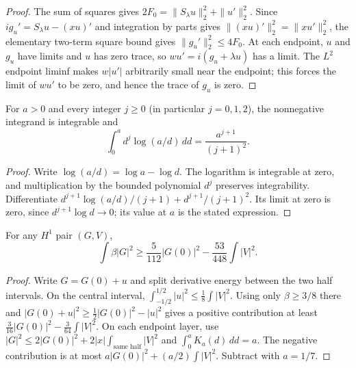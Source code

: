 \begin{proof}
\leanok
The sum of squares gives $2F_0=\|S_\lambda u\|_2^2+\|u'\|_2^2$.
Since $ig_u'=S_\lambda u-(xu)'$ and integration by parts gives
$\|(xu)'\|_2^2=\|xu'\|_2^2$, the elementary two-term square bound gives
$\|g_u'\|_2^2\le4F_0$.
At each endpoint, $u$ and $g_u$ have limits and $u$ has zero trace,
so $wu'=i(g_u+\lambda u)$ has a limit.
The $L^2$ endpoint liminf makes $w|u'|$ arbitrarily small near the endpoint;
this forces the limit of $wu'$ to be zero, and hence the trace of $g_u$ is zero.
\end{proof}

\begin{lemma}
\label{lem:corrected-log-moments}
\leanok
For $a>0$ and every integer $j\ge0$ (in particular $j=0,1,2$),
the nonnegative integrand is integrable and
\[
 \int_0^a d^j\log(a/d)\,dd=\frac{a^{j+1}}{(j+1)^2}.
\]
\end{lemma}

\begin{proof}
\leanok
Write $\log(a/d)=\log a-\log d$. The logarithm is integrable at zero,
and multiplication by the bounded polynomial $d^j$ preserves integrability.
Differentiate
$d^{j+1}\log(a/d)/(j+1)+d^{j+1}/(j+1)^2$.
Its limit at zero is zero, since $d^{j+1}\log d\to0$;
its value at $a$ is the stated expression.
\end{proof}

\begin{lemma}
\label{lem:corrected-midpoint-bound}
\leanok
For any $H^1$ pair $(G,V)$,
\[
 \int\beta|G|^2\ge\frac5{112}|G(0)|^2-\frac{53}{448}\int|V|^2.
\]
\end{lemma}

\begin{proof}
\leanok
Write $G=G(0)+u$ and split derivative energy between the two half intervals.
On the central interval,
$\int_{-1/2}^{1/2}|u|^2\le\frac18\int|V|^2$.
Using only $\beta\ge3/8$ there and
$|G(0)+u|^2\ge\frac12|G(0)|^2-|u|^2$ gives a positive contribution
at least $\frac3{16}|G(0)|^2-\frac3{64}\int|V|^2$.
On each endpoint layer, use
$|G|^2\le2|G(0)|^2+2|x|\int_{\text{same half}}|V|^2$
and $\int_0^a K_a(d)\,dd=a$.
The negative contribution is at most
$a|G(0)|^2+(a/2)\int|V|^2$. Subtract with $a=1/7$.
\end{proof}

